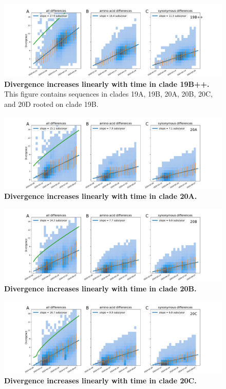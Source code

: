 \begin{figure}[h]
    \includegraphics[width=\textwidth]{figures/rtt/19B++_rtt.pdf}
    \caption{{\bf Divergence increases linearly with time in clade 19B++.}
    This figure contains sequences in clades 19A, 19B, 20A, 20B, 20C, and 20D rooted on clade 19B.
    \label{fig:19B++_divergence}}
\end{figure}

\begin{figure}[h]
    \includegraphics[width=\textwidth]{figures/rtt/20A_rtt.pdf}
    \caption{{\bf Divergence increases linearly with time in clade 20A.}
    \label{fig:20A_divergence}}
\end{figure}

\begin{figure}[h]
    \includegraphics[width=\textwidth]{figures/rtt/20B_rtt.pdf}
    \caption{{\bf Divergence increases linearly with time in clade 20B.}
    \label{fig:20B_divergence}}
\end{figure}

\begin{figure}[h]
    \includegraphics[width=\textwidth]{figures/rtt/20C_rtt.pdf}
    \caption{{\bf Divergence increases linearly with time in clade 20C.}
    \label{fig:20C_divergence}}
\end{figure}


